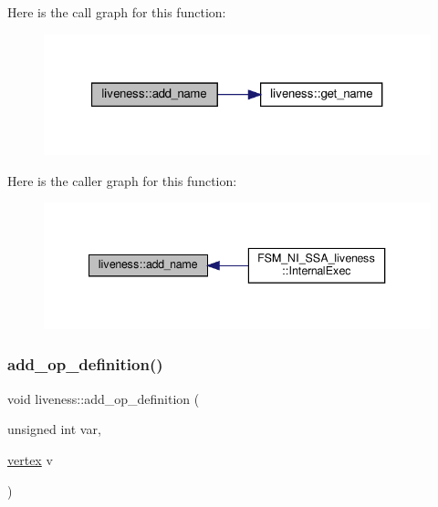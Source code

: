 Here is the call graph for this function\+:
\nopagebreak
\begin{figure}[H]
\begin{center}
\leavevmode
\includegraphics[width=321pt]{d3/d1f/classliveness_a67923b3a3e7ebdf4c92b87977e7be7cd_cgraph}
\end{center}
\end{figure}
Here is the caller graph for this function\+:
\nopagebreak
\begin{figure}[H]
\begin{center}
\leavevmode
\includegraphics[width=340pt]{d3/d1f/classliveness_a67923b3a3e7ebdf4c92b87977e7be7cd_icgraph}
\end{center}
\end{figure}
\mbox{\label{classliveness_a4f1473f6c023b994a455fceaea3c9015}} 
\subsubsection{\texorpdfstring{add\+\_\+op\+\_\+definition()}{add\_op\_definition()}}
{\footnotesize\ttfamily void liveness\+::add\+\_\+op\+\_\+definition (\begin{DoxyParamCaption}\item[{unsigned int}]{var,  }\item[{\hyperlink{graph_8hpp_abefdcf0544e601805af44eca032cca14}{vertex}}]{v }\end{DoxyParamCaption})\hspace{0.3cm}{\ttfamily [inline]}}



